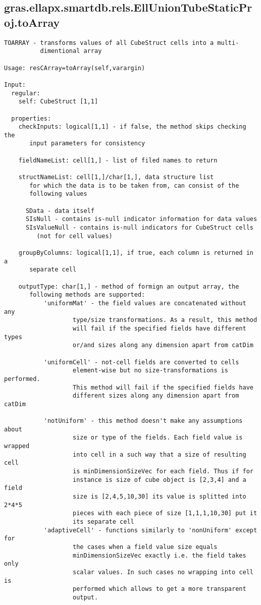 \subsection{\texorpdfstring{gras.ellapx.smartdb.rels.EllUnionTubeStaticProj.toArray}{toArray}}\label{method:gras.ellapx.smartdb.rels.EllUnionTubeStaticProj.toArray}
\begin{verbatim}
TOARRAY - transforms values of all CubeStruct cells into a multi-
          dimentional array

Usage: resCArray=toArray(self,varargin)

Input:
  regular:
    self: CubeStruct [1,1]

  properties:
    checkInputs: logical[1,1] - if false, the method skips checking the
       input parameters for consistency

    fieldNameList: cell[1,] - list of filed names to return

    structNameList: cell[1,]/char[1,], data structure list
       for which the data is to be taken from, can consist of the
       following values

      SData - data itself
      SIsNull - contains is-null indicator information for data values
      SIsValueNull - contains is-null indicators for CubeStruct cells
         (not for cell values)

    groupByColumns: logical[1,1], if true, each column is returned in a
       separate cell

    outputType: char[1,] - method of formign an output array, the
       following methods are supported:
           'uniformMat' - the field values are concatenated without any
                   type/size transformations. As a result, this method
                   will fail if the specified fields have different types
                   or/and sizes along any dimension apart from catDim

           'uniformCell' - not-cell fields are converted to cells
                   element-wise but no size-transformations is performed.
                   This method will fail if the specified fields have
                   different sizes along any dimension apart from catDim

           'notUniform' - this method doesn't make any assumptions about
                   size or type of the fields. Each field value is wrapped
                   into cell in a such way that a size of resulting cell
                   is minDimensionSizeVec for each field. Thus if for
                   instance is size of cube object is [2,3,4] and a field
                   size is [2,4,5,10,30] its value is splitted into 2*4*5
                   pieces with each piece of size [1,1,1,10,30] put it
                   its separate cell
           'adaptiveCell' - functions similarly to 'nonUniform' except for
                   the cases when a field value size equals
                   minDimensionSizeVec exactly i.e. the field takes only
                   scalar values. In such cases no wrapping into cell is
                   performed which allows to get a more transparent
                   output.


\end{verbatim}
